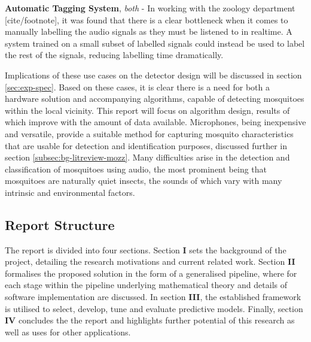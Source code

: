 \begin{sitemize}
            \item{\textbf{Automatic Tagging System}, \textit{both} - In working with the zoology department [cite/footnote], it was found that there is a clear bottleneck when it comes to manually labelling the audio signals as they must be listened to in realtime. A system trained on a small subset of labelled signals could instead be used to label the rest of the signals, reducing labelling time dramatically.}
        \end{sitemize}
        Implications of these use cases on the detector design will be discussed in section \ref{sec:exp-spec}. Based on these cases, it is clear there is a need for both a hardware solution and accompanying algorithms, capable of detecting mosquitoes within the local vicinity. This report will focus on algorithm design, results of which improve with the amount of data available. Microphones, being inexpensive and versatile, provide a suitable method for capturing mosquito characteristics that are usable for detection and identification purposes, discussed further in section \ref{subsec:bg-litreview-mozz}. Many difficulties arise in the detection and classification of mosquitoes using audio, the most prominent being that mosquitoes are naturally quiet insects, the sounds of which vary with many intrinsic and environmental factors.
        
        
        
        
        
        
  
    \subsection{Report Structure}
    \label{subsec:bg-intro-structure}
        The report is divided into four sections. Section \textbf{I} sets the background of the project, detailing the research motivations and current related work. Section \textbf{II} formalises the proposed solution in the form of a generalised pipeline, where for each stage within the pipeline underlying mathematical theory and details of software implementation are discussed. In section \textbf{III}, the established framework is utilised to select, develop, tune and evaluate predictive models. Finally, section \textbf{IV} concludes the the report and highlights further potential of this research as well as uses for other applications.